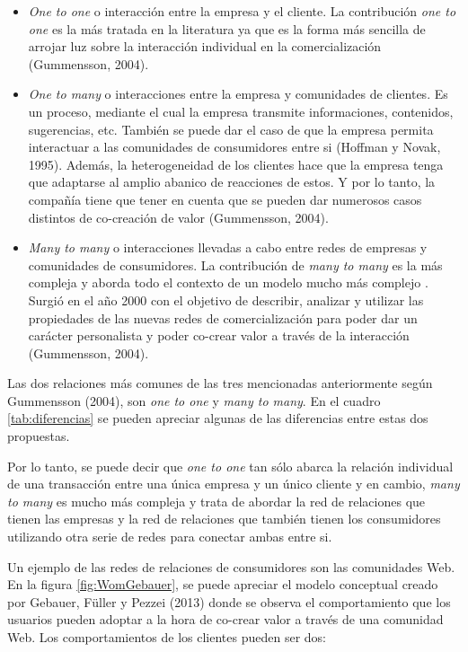 \begin{itemize}
	\item \emph{One to one} o interacción entre la empresa y el cliente. La contribución \emph{one to one} es la más tratada en la literatura ya que es la forma más sencilla de arrojar luz sobre la interacción individual en la comercialización (Gummensson, 2004).


	\item \emph{One to many} o interacciones entre la empresa y comunidades de clientes. Es un proceso, mediante el cual la empresa transmite informaciones, contenidos, sugerencias, etc. También se puede dar el caso de que la empresa permita interactuar a las comunidades de consumidores entre si (Hoffman y Novak, 1995). Además, la heterogeneidad de los clientes hace que la empresa tenga que adaptarse al amplio abanico de reacciones de estos. Y por lo tanto, la compañía tiene que tener en cuenta que se pueden dar numerosos casos distintos de co-creación de valor (Gummensson, 2004).

 	\item \emph{Many to many} o interacciones llevadas a cabo entre redes de empresas y comunidades de consumidores. La contribución de \emph{many to many} es la más compleja y aborda todo el contexto de un modelo mucho más complejo . Surgió en el año 2000 con el objetivo de describir, analizar y utilizar las propiedades de las nuevas redes de comercialización para poder dar un carácter personalista y poder co-crear valor a través de la interacción (Gummensson, 2004).

\end{itemize}


 Las dos relaciones más comunes de las tres mencionadas anteriormente según Gummensson (2004), son \emph{one to one} y \emph{many to many}. En el cuadro \ref{tab:diferencias} se pueden apreciar algunas de las diferencias entre estas dos propuestas.



 Por lo tanto, se puede decir que \emph{one to one} tan sólo abarca la relación individual de una transacción entre una única empresa y un único cliente y en cambio, \emph{many to many} es mucho más compleja y trata de abordar la red de relaciones que tienen las empresas y la red de relaciones que también tienen los consumidores utilizando otra serie de redes para conectar ambas entre si.

Un ejemplo de las redes de relaciones de consumidores son las comunidades Web. En la figura \ref{fig:WomGebauer}, se puede apreciar el modelo conceptual creado por Gebauer, Füller y Pezzei (2013) donde se observa el comportamiento que los usuarios pueden adoptar a la hora de co-crear valor a través de una comunidad Web. Los comportamientos de los clientes pueden ser dos:

